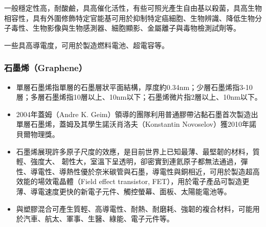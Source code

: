 \documentclass[a4paper,12pt]{report}
\begin{document}
\begin{itemize}
\begin{itemize}
\begin{itemize}
一般穩定性高，耐酸鹼，具高催化活性，有些可照光產生自由基以殺菌，具高生物相容性，具有外圍修飾特定官能基可用於抑制特定癌細胞、生物辨識、降低生物分子毒性、生物影像與生物感測器、細胞顯影、金屬離子與毒物檢測試劑等。

一些具高導電度，可用於製造燃料電池、超電容等。
\subsubsection{石墨烯（Graphene）}
\begin{itemize}
\item 單層石墨烯指單層的石墨層狀平面結構，厚度約0.34nm；少層石墨烯指3-10層；多層石墨烯指10層以上、10nm以下；石墨烯微片指2層以上、10nm以下。
\item 2004年蓋姆（Andre K. Geim）領導的團隊利用普通膠帶沾黏石墨首次製造出單層石墨烯，蓋姆及其學生諾沃肖洛夫（Konstantin Novoselov）獲2010年諾貝爾物理獎。
\item 石墨烯展現許多原子尺度的效應，是目前世界上已知最薄、最堅韌的材料，質輕、強度大、 韌性大，室溫下呈透明，卻密實到連氦原子都無法通過，彈性、導電性、導熱性優於奈米碳管與石墨，導電性與銅相近，可用於製造超高效能的場效電晶體（Field effect transistor, FET），用於電子產品可製造更薄、導電速度更快的新電子元件、觸控螢幕、面板、太陽能電池等。
\item 與塑膠混合可產生質輕、高導電性、耐熱、耐磨耗、強韌的複合材料，可能用於汽車、航太、軍事、生醫、綠能、電子元件等。
\end{itemize}

\end{itemize}
\end{itemize}
\end{itemize}
\end{document}
